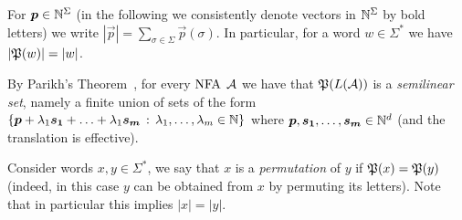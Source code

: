 For $\boldsymbol{p}\in \mathbb{N}^\Sigma$ (in the following we consistently denote vectors in $\mathbb{N}^\Sigma$ by bold letters) we write $|\vec{p}|=\sum_{\sigma\in \Sigma}\vec{p}(\sigma)$. In particular, for a word $w\in \Sigma^*$ we have $|\mathfrak{P}(w)|=|w|$.

By Parikh's Theorem~\cite{Parikh1966}, for every $\mbox{\rm NFA}$ $\mathcal{A}$ we have that $\mathfrak{P}(L(\mathcal{A}))$ is a \emph{semilinear set}, namely a finite union of sets of the form $\{\boldsymbol{p}+\lambda_1 \boldsymbol{s_1}+\ldots+\lambda_1 \boldsymbol{s_m}\, :\, \lambda_1,\ldots,\lambda_m\in \mathbb{N}\}$ where $\boldsymbol{p},\boldsymbol{s_1},\ldots,\boldsymbol{s_m}\in \mathbb{N}^d$ (and the translation is effective).

Consider words $x,y\in \Sigma^*$, we say that $x$ is a \emph{permutation} of $y$ if $\mathfrak{P}(x)=\mathfrak{P}(y)$ (indeed, in this case $y$ can be obtained from $x$ by permuting its letters). Note that in particular this implies $|x|=|y|$.

